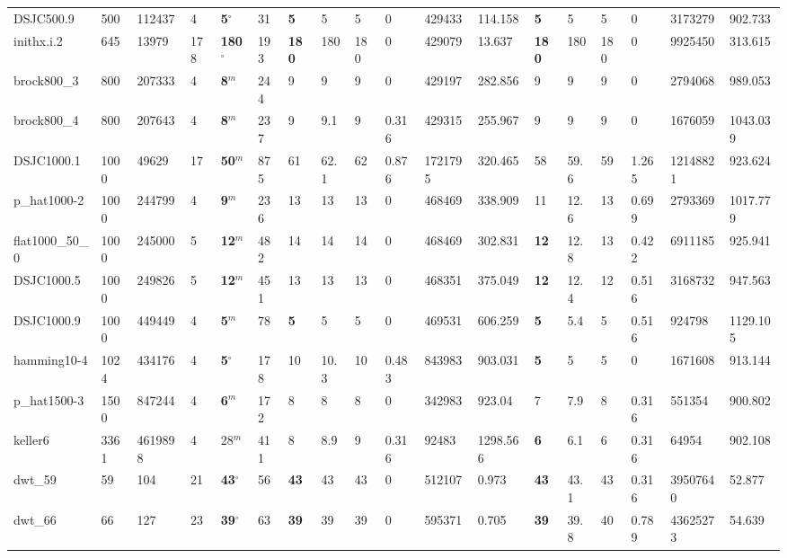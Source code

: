 \begin{table}[h!]
{\begin{tabular}{llllllllllllllllll}
            DSJC500.9 & 500 & 112437 & 4 & \textbf{5}$^{\circ}$ & 31 & \textbf{5} & 5 & 5 & 0 & 429433 & 114.158 & \textbf{5} & 5 & 5 & 0 & 3173279 & 902.733 \\
            inithx.i.2 & 645 & 13979 & 178 & \textbf{180}$^{\circ}$ & 193 & \textbf{180} & 180 & 180 & 0 & 429079 & 13.637 & \textbf{180} & 180 & 180 & 0 & 9925450 & 313.615 \\
            brock800\_3 & 800 & 207333 & 4 & \textbf{8}$^{m}$ & 244 & 9 & 9 & 9 & 0 & 429197 & 282.856 & 9 & 9 & 9 & 0 & 2794068 & 989.053 \\
            brock800\_4 & 800 & 207643 & 4 & \textbf{8}$^{m}$ & 237 & 9 & 9.1 & 9 & 0.316 & 429315 & 255.967 & 9 & 9 & 9 & 0 & 1676059 & 1043.039 \\
            DSJC1000.1 & 1000 & 49629 & 17 & \textbf{50}$^{m}$ & 875 & 61 & 62.1 & 62 & 0.876 & 1721795 & 320.465 & 58 & 59.6 & 59 & 1.265 & 12148821 & 923.624 \\
            p\_hat1000-2 & 1000 & 244799 & 4 & \textbf{9}$^{m}$ & 236 & 13 & 13 & 13 & 0 & 468469 & 338.909 & 11 & 12.6 & 13 & 0.699 & 2793369 & 1017.779 \\
            flat1000\_50\_0 & 1000 & 245000 & 5 & \textbf{12}$^{m}$ & 482 & 14 & 14 & 14 & 0 & 468469 & 302.831 & \textbf{12} & 12.8 & 13 & 0.422 & 6911185 & 925.941 \\
            DSJC1000.5 & 1000 & 249826 & 5 & \textbf{12}$^{m}$ & 451 & 13 & 13 & 13 & 0 & 468351 & 375.049 & \textbf{12} & 12.4 & 12 & 0.516 & 3168732 & 947.563 \\
            DSJC1000.9 & 1000 & 449449 & 4 & \textbf{5}$^{m}$ & 78 & \textbf{5} & 5 & 5 & 0 & 469531 & 606.259 & \textbf{5} & 5.4 & 5 & 0.516 & 924798 & 1129.105 \\
            hamming10-4 & 1024 & 434176 & 4 & \textbf{5}$^{\circ}$ & 178 & 10 & 10.3 & 10 & 0.483 & 843983 & 903.031 & \textbf{5} & 5 & 5 & 0 & 1671608 & 913.144 \\
            p\_hat1500-3 & 1500 & 847244 & 4 & \textbf{6}$^{m}$ & 172 & 8 & 8 & 8 & 0 & 342983 & 923.04 & 7 & 7.9 & 8 & 0.316 & 551354 & 900.802 \\
            keller6 & 3361 & 4619898 & 4 & 28$^{m}$ & 411 & 8 & 8.9 & 9 & 0.316 & 92483 & 1298.566 & \textbf{6} & 6.1 & 6 & 0.316 & 64954 & 902.108 \\
            dwt\_59 & 59 & 104 & 21 & \textbf{43}$^{\circ}$ & 56 & \textbf{43} & 43 & 43 & 0 & 512107 & 0.973 & \textbf{43} & 43.1 & 43 & 0.316 & 39507640 & 52.877 \\
            dwt\_66 & 66 & 127 & 23 & \textbf{39}$^{\circ}$ & 63 & \textbf{39} & 39 & 39 & 0 & 595371 & 0.705 & \textbf{39} & 39.8 & 40 & 0.789 & 43625273 & 54.639 \\

\end{tabular}}
\end{table}
